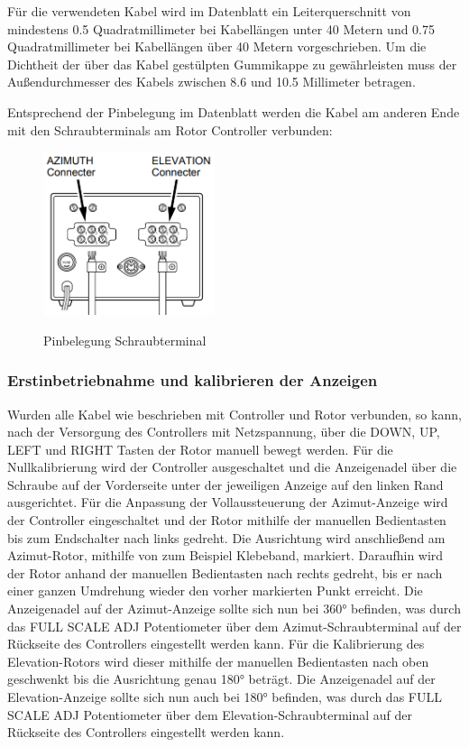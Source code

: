 Für die verwendeten Kabel wird im Datenblatt ein Leiterquerschnitt von mindestens 0.5 Quadratmillimeter bei Kabellängen unter 40 Metern und 0.75 Quadratmillimeter bei Kabellängen über 40 Metern vorgeschrieben. Um die Dichtheit der über das Kabel gestülpten Gummikappe zu gewährleisten muss der Außendurchmesser des Kabels zwischen 8.6 und 10.5 Millimeter betragen.
 
Entsprechend der Pinbelegung im Datenblatt werden die Kabel am anderen Ende mit den Schraubterminals am Rotor Controller verbunden:
\begin{figure}[H]
	\cite{noauthor_yaesu_nodate}
	\centering
	\includegraphics[width=5cm]{../ref/RotorInstallationScrewTerminal.png}
	\label{fig:Rotor_Schraubterminal}
	\caption{Pinbelegung Schraubterminal}
\end{figure}

\subsubsection{Erstinbetriebnahme und kalibrieren der Anzeigen}
Wurden alle Kabel wie beschrieben mit Controller und Rotor verbunden, so kann, nach der Versorgung des Controllers mit Netzspannung, über die DOWN, UP, LEFT und RIGHT Tasten der Rotor manuell bewegt werden. 
\newline
Für die  Nullkalibrierung wird der Controller ausgeschaltet und die Anzeigenadel über die Schraube auf der Vorderseite unter der jeweiligen Anzeige auf den linken Rand ausgerichtet. Für die Anpassung der Vollaussteuerung der Azimut-Anzeige wird der Controller eingeschaltet und der Rotor mithilfe der manuellen Bedientasten bis zum Endschalter nach links gedreht. Die Ausrichtung wird anschließend am Azimut-Rotor, mithilfe von zum Beispiel Klebeband, markiert. Daraufhin wird der Rotor anhand der manuellen Bedientasten nach rechts gedreht, bis er nach einer ganzen Umdrehung wieder den vorher markierten Punkt erreicht. Die Anzeigenadel auf der Azimut-Anzeige sollte sich nun bei 360° befinden, was durch das FULL SCALE ADJ Potentiometer über dem Azimut-Schraubterminal auf der Rückseite des Controllers eingestellt werden kann. Für die Kalibrierung des Elevation-Rotors wird dieser mithilfe der manuellen Bedientasten nach oben geschwenkt bis die Ausrichtung genau 180° beträgt. Die Anzeigenadel auf der Elevation-Anzeige sollte sich nun auch bei 180° befinden, was durch das FULL SCALE ADJ Potentiometer über dem Elevation-Schraubterminal auf der Rückseite des Controllers eingestellt werden kann.

